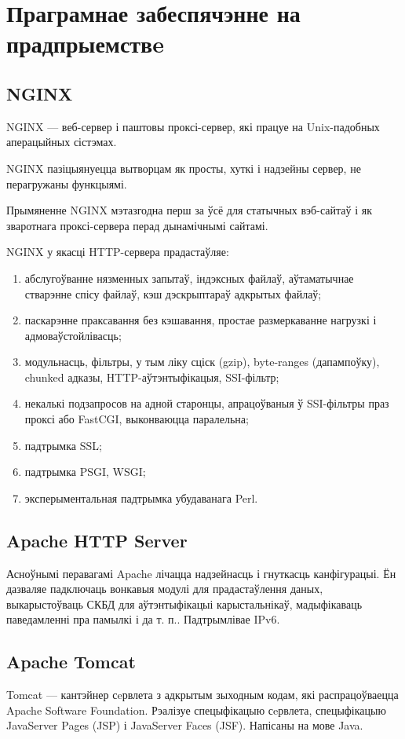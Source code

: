 \section{Праграмнае забеспячэнне на прадпрыемствe}

\subsection{NGINX}
NGINX --- веб-сервер і паштовы проксі-сервер, які працуе на Unix-падобных аперацыйных сістэмах.

NGINX пазіцыянуецца вытворцам як просты, хуткі і надзейны сервер, не перагружаны функцыямі.

Прымяненне NGINX мэтазгодна перш за ўсё для статычных вэб-сайтаў і як зваротнага проксі-сервера перад дынамічнымі сайтамі.

NGINX у якасці HTTP-сервера прадастаўляе:
\begin{enumerate}
    \item абслугоўванне нязменных запытаў, індэксных файлаў, аўтаматычнае стварэнне спісу файлаў, кэш дэскрыптараў адкрытых файлаў;
    \item паскарэнне праксавання без кэшавання, простае размеркаванне нагрузкі і адмоваўстойлівасць;
    \item модульнасць, фільтры, у тым ліку сціск (gzip), byte-ranges (дапампоўку), chunked адказы, HTTP-аўтэнтыфікацыя, SSI-фільтр;
    \item некалькі подзапросов на адной старонцы, апрацоўваныя ў SSI-фільтры праз проксі або FastCGI, выконваюцца паралельна;
    \item падтрымка SSL;
    \item падтрымка PSGI, WSGI;
    \item эксперыментальная падтрымка убудаванага Perl.
\end{enumerate}

\subsection{Apache HTTP Server}
Асноўнымі перавагамі Apache лічацца надзейнасць і гнуткасць канфігурацыі. Ён дазваляе
падключаць вонкавыя модулі для прадастаўлення даных,
выкарыстоўваць СКБД для аўтэнтыфікацыі карыстальнікаў, мадыфікаваць паведамленні пра памылкі і да т. п..
Падтрымлівае IPv6.

\subsection{Apache Tomcat}
Tomcat --- кантэйнер сeрвлета з адкрытым зыходным кодам, які распрацоўваецца Apache Software Foundation. Рэалізуе спецыфікацыю сeрвлета, спецыфікацыю JavaServer Pages (JSP) і JavaServer Faces (JSF). Напісаны на мове Java.

